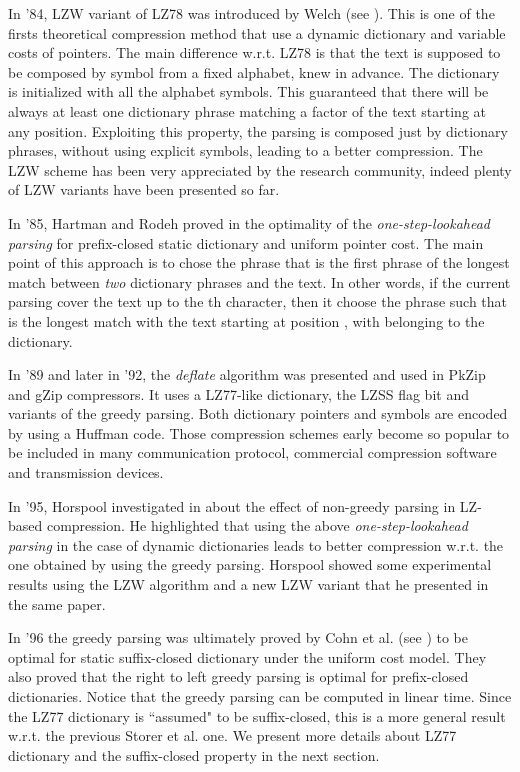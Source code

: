 \documentclass[12pt]{article}
\theoremstyle{plain}
\theoremstyle{definition}
\theoremstyle{remark}
\begin{document}
In '84, LZW variant of LZ78 was introduced by Welch (see \cite{lzw}). This is one of the firsts theoretical compression method that use a dynamic dictionary and variable costs of pointers. The main difference w.r.t. LZ78 is that the text is supposed to be composed by symbol from a fixed alphabet, knew in advance. The dictionary is initialized with all the alphabet symbols. This guaranteed that there will be always at least one dictionary phrase matching a factor of the text starting at any position. Exploiting this property, the parsing is composed just by dictionary phrases, without using explicit symbols, leading to a better compression. The LZW scheme has been very appreciated by the research community, indeed plenty of LZW variants have been presented so far.


In '85, Hartman and Rodeh proved in \cite{rodeh1985} the optimality of the 
\emph{one-step-lookahead parsing} for prefix-closed static dictionary and uniform pointer cost. The main point of this approach is to chose the phrase that is the first phrase of the longest match between \emph{two} dictionary phrases and the text. In other words, if the current parsing cover the text up to the th character, then it choose the phrase  such that  is the longest match with the text starting at position , with  belonging to the dictionary. 


In '89 and later in '92, the \emph{deflate} algorithm was presented and used in PkZip and gZip compressors. It uses a LZ77-like dictionary, the LZSS flag bit and variants of the greedy parsing. Both dictionary pointers and symbols are encoded by using a Huffman code. Those compression schemes early become so popular to be included in many communication protocol, commercial compression software and transmission devices. 

In '95, Horspool investigated in \cite{DBLP:conf/dcc/Horspool95} about the effect of non-greedy parsing in LZ-based compression. He highlighted that using the above \emph{one-step-lookahead parsing} in the case of dynamic dictionaries leads to better compression w.r.t. the one obtained by using the greedy parsing. Horspool showed some experimental results using the LZW algorithm and a new LZW variant that he presented in the same paper. 

In '96 the greedy parsing was ultimately proved by Cohn et al. (see \cite{DBLP:conf/dcc/CohnK96}) to be optimal for static suffix-closed dictionary under the uniform cost model. They also proved that the right to left greedy parsing is optimal for prefix-closed dictionaries. Notice that the greedy parsing can be computed in linear time. Since the LZ77 dictionary is ``assumed" to be suffix-closed, this is a more general result w.r.t. the previous Storer et al. one. We present more details about LZ77 dictionary and the suffix-closed property in the next section.
\end{document}
